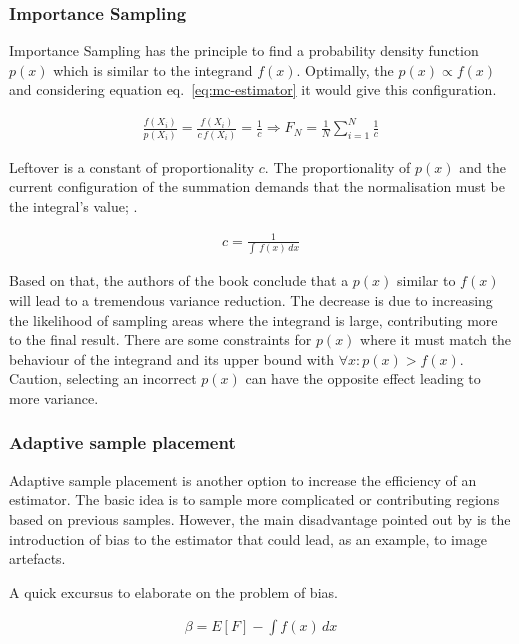 \subsubsection*{Importance Sampling}

Importance Sampling has the principle to find a probability density function $p(x)$ which is similar to the integrand $f(x)$.
Optimally, the $p(x) \propto f(x)$ and considering equation eq.~\ref{eq:mc-estimator} it would give this configuration.

\begin{align*}
    \frac{f(X_i)}{p(X_i)}=\frac{f(X_i)}{c\,f(X_i)}=\frac{1}{c} \Rightarrow F_N=\frac{1}{N}\sum_{i=1}^{N}\frac{1}{c}
\end{align*}

Leftover is a constant of proportionality $c$.
The proportionality of $p(x)$ and the current configuration of the summation demands that the normalisation must be the integral's value; \cite{veach_robust_1997}.

\begin{align*}
    c=\frac{1}{\int\,f(x)\,dx}
\end{align*}

Based on that, the authors of the book \cite{kalos_monte_2008} conclude that a $p(x)$ similar to $f(x)$ will lead to a tremendous variance reduction.
The decrease is due to increasing the likelihood of sampling areas where the integrand is large, contributing more to the final result.
There are some constraints for $p(x)$ where it must match the behaviour of the integrand and its upper bound with $\forall x : p(x) > f(x)$.
Caution, selecting an incorrect $p(x)$ can have the opposite effect leading to more variance.

\subsubsection*{Adaptive sample placement}

Adaptive sample placement is another option to increase the efficiency of an estimator.
The basic idea is to sample more complicated or contributing regions based on previous samples.
However, the main disadvantage pointed out by \cite{veach_robust_1997} is the introduction of bias to the estimator that could lead, as an example, to image artefacts.

A quick excursus to elaborate on the problem of bias.

\begin{align*}
    \beta = E[F]-\int f(x)\,dx
\end{align*}

